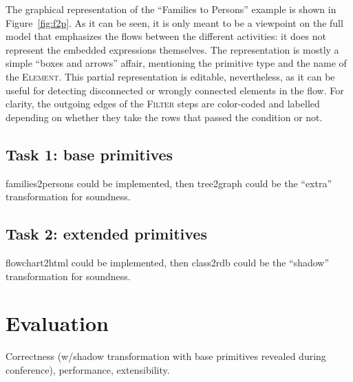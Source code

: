 \documentclass[a4paper]{scrartcl}
\newcommand*{\class}[1]{\textsc{#1}}
\begin{document}
The graphical representation of the ``Families to Persons'' example is
shown in Figure~\ref{fig:f2p}. As it can be seen, it is only meant to
be a viewpoint on the full model that emphasizes the flows between the
different activities: it does not represent the embedded expressions
themselves. The representation is mostly a simple ``boxes and arrows''
affair, mentioning the primitive type and the name of the
\class{Element}. This partial representation is editable,
nevertheless, as it can be useful for detecting disconnected or
wrongly connected elements in the flow. For clarity, the outgoing
edges of the \class{Filter} steps are color-coded and labelled
depending on whether they take the rows that passed the condition or
not.

\subsection{Task 1: base primitives}
\label{sec:baseprim}


families2persons could be implemented, then tree2graph could be the
``extra'' transformation for soundness.

\subsection{Task 2: extended primitives}
\label{sec:extprim}


flowchart2html could be implemented, then class2rdb could be the
``shadow'' transformation for soundness.

\section{Evaluation}
\label{sec:eval}

Correctness (w/shadow transformation with base primitives revealed
during conference), performance, extensibility.



\end{document}
